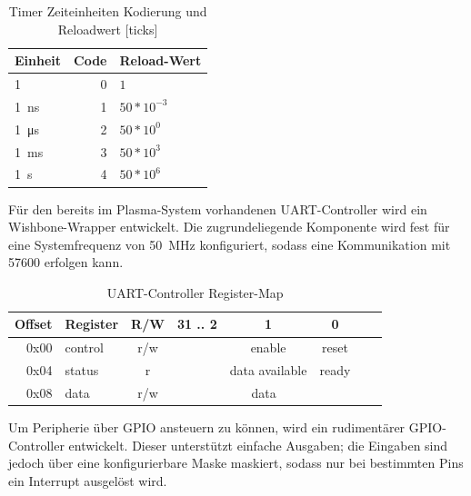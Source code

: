 \begin{table}[!htbp]
	\bigskip
	\centering
	\begin{tabular}{ | l | r | l | }
		\hline
		\textbf{Einheit} & \textbf{Code} & \textbf{Reload-Wert} \\
		\hline
		\SI{1}{\tick}  & 0 & $1$  \\
		\hline
		\SI{1}{\nano\second} & 1 & $ 50 * 10^{-3} $ \\
		\hline
		\SI{1}{\micro\second} & 2 & $ 50 * 10^0 $  \\
		\hline
		\SI{1}{\milli\second} & 3 & $ 50 * 10^3 $  \\
		\hline
		\SI{1}{\second} & 4 & $ 50 * 10^6 $  \\
		\hline
	\end{tabular}
	
	\caption{Timer Zeiteinheiten Kodierung und Reloadwert [ticks]}
	\label{tab:timer_units}
\end{table}

Für den bereits im Plasma-System vorhandenen \gls{UART}-Controller wird ein Wishbone-Wrapper entwickelt. Die zugrundeliegende Komponente wird fest für eine Systemfrequenz von \SI{50}{\mega\hertz} konfiguriert, sodass eine Kommunikation mit \SI{57600}{\baud} erfolgen kann.

\begin{table}[!htbp]
	\bigskip
	\centering
	\begin{tabular}{ | r | l | c | c | c | c | c | c |}
		\hline
		\textbf{Offset} & \textbf{Register} & \textbf{R/W} & \textbf{31 .. 2} & \textbf{1} & \textbf{0} \\
		\hline
		0x00 & control & r/w & & enable & reset \\
		\hline
		0x04 & status & r & & data available & ready \\
		\hline
		0x08 & data & r/w & \multicolumn{3}{c|}{data} \\
		\hline
	\end{tabular}
	
	\caption{UART-Controller Register-Map}
	\label{tab:uart_reg_map}
\end{table}

Um Peripherie über \gls{GPIO} ansteuern zu können, wird ein rudimentärer \gls{GPIO}-Controller entwickelt. Dieser unterstützt einfache Ausgaben; die Eingaben sind jedoch über eine konfigurierbare Maske maskiert, sodass nur bei bestimmten Pins ein Interrupt ausgelöst wird. 

